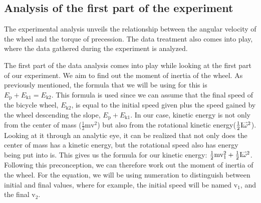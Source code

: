 \documentclass{article}
\newcommand{\myvect}[1]{\accentset{\rightharpoonup}{#1}}
\begin{document}
\subsection{Analysis of the first part of the experiment}
The experimental analysis unveils the relationship between the angular velocity of the wheel and the torque of precession. The data treatment also comes into play, where the data gathered during the experiment is analyzed.

The first part of the data analysis comes into play while looking at the first part of our experiment. We aim to find out the moment of inertia of the wheel. As previously mentioned, the formula that we will be using for this is $E_{\text{p}} + E_{\text{k}1} = E_{\text{k}2}$. This formula is used since we can assume that the final speed of the bicycle wheel, $E_{\text{k}2}$, is equal to the initial speed given plus the speed gained by the wheel descending the slope, $E_{\text{p}} + E_{\text{k}1}$. In our case, kinetic energy is not only from the center of mass ($\frac{1}{2}\text{mv}^{2}$) but also from the rotational kinetic energy($\frac{1}{2}\text{I}\myvect{\omega}^{2}$). Looking at it through an analytic eye, it can be realized that not only does the center of mass has a kinetic energy, but the rotational speed also has energy being put into is. This gives us the formula for our kinetic energy: $\frac{1}{2}\text{mv}^{2}_1+\frac{1}{2}\text{I}\myvect{\omega}^{2}$. Following this preconception, we can therefore work out the moment of inertia of the wheel. For the equation, we will be using numeration to distinguish between initial and final values, where for example, the initial speed will be named $\text{v}_1$, and the final $\text{v}_2$.
\end{document}
